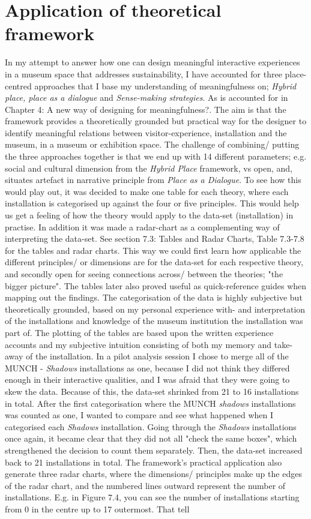 \section{Application of theoretical framework}
In my attempt to answer how one can design meaningful interactive experiences in a museum space that addresses sustainability, I have accounted for three place-centred approaches that I base my understanding of meaningfulness on; \emph{Hybrid place, place as a dialogue} and \emph{Sense-making strategies}. As is accounted for in Chapter 4: A new way of designing for meaningfulness?. The aim is that the framework provides a theoretically grounded but practical way for the designer to identify meaningful relations between visitor-experience, installation and the museum, in a museum or exhibition space. The challenge of combining/ putting the three approaches together is that we end up with 14 different parameters; e.g. social and cultural dimension from the \emph{Hybrid Place} framework, vs open, and, situates artefact in narrative principle from \emph{Place as a Dialogue}. To see how this would play out, it was decided to make one table for each theory, where each installation is categorised up against the four or five principles. This would help us get a feeling of how the theory would apply to the data-set (installation) in practise. In addition it was made a radar-chart as a complementing way of interpreting the data-set. See section 7.3: Tables and Radar Charts, Table 7.3-7.8 for the tables and radar charts. This way we could first learn how applicable the different principles/ or dimensions are for the data-set for each respective theory, and secondly open for seeing connections across/ between the theories; "the bigger picture". The tables later also proved useful as quick-reference guides when mapping out the findings. The categorisation of the data is highly subjective but theoretically grounded, based on my personal experience with- and interpretation of the installations and knowledge of the museum institution the installation was part of. The plotting of the tables are based upon the written experience accounts and my subjective intuition consisting of both my memory and take-away of the installation. In a pilot analysis session I chose to merge all of the MUNCH - \emph{Shadows} installations as one, because I did not think they differed enough in their interactive qualities, and I was afraid that they were going to skew the data. Because of this, the data-set shrinked from 21 to 16 installations in total. After the first categorisation where the MUNCH \emph{shadows} installations was counted as one, I wanted to compare and see what happened when I categorised each \emph{Shadows} installation. Going through the \emph{Shadows} installations once again, it became clear that they did not all "check the same boxes", which strengthened the decision to count them separately. Then, the data-set increased back to 21 installations in total. The framework's practical application also generate three radar charts, where the dimensions/ principles make up the edges of the radar chart, and the numbered lines outward represent the number of installations. E.g. in Figure 7.4, you can see the number of installations starting from 0 in the centre up to 17 outermost. That tell 